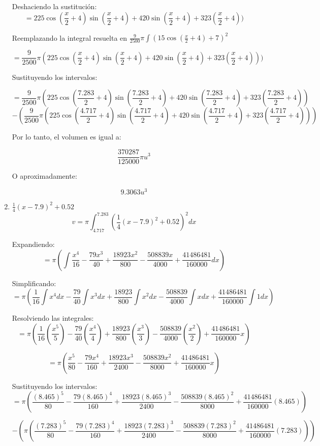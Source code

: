 \documentclass{article}
\begin{document}
\begin{enumerate}
    Deshaciendo la sustitución:
    $$ = 225\cos(\frac{x}{2} + 4) \sin(\frac{x}{2} + 4)+ 420\sin(\frac{x}{2} + 4) + 323 (\frac{x}{2} + 4) )$$
    
    Reemplazando la integral resuelta en $\frac{9}{2500} \pi \int (15 \cos(\frac{x}{2} + 4) + 7)^2$
    
    $$ = \frac{9}{2500} \pi (225\cos(\frac{x}{2} + 4) \sin(\frac{x}{2} + 4)+ 420\sin(\frac{x}{2} + 4) + 323 (\frac{x}{2} + 4) ))$$
    
    Sustituyendo los intervalos:
    
    $$ = \frac{9}{2500} \pi (225\cos(\frac{7.283}{2} + 4) \sin(\frac{7.283}{2} + 4)+ 420\sin(\frac{7.283}{2} + 4) + 323 (\frac{7.283}{2} + 4))$$
    $$ - (\frac{9}{2500} \pi (225\cos(\frac{4.717}{2} + 4) \sin(\frac{4.717}{2} + 4)+ 420\sin(\frac{4.717}{2} + 4) + 323 (\frac{4.717}{2} + 4)))$$
    
    Por lo tanto, el volumen es igual a:
    
    $$\frac{370287}{125000} \pi u^3$$
    
    O aproximadamente:
    
    $$9.3063 u^3$$
    
    \pagebreak
    
    
    \item $\frac{1}{4} (x-7.9)^2+0.52$
    $$ v = \pi \int_{4.717}^{7.283} (\frac{1}{4} (x-7.9)^2+0.52)^2 dx$$
    
    Expandiendo:
    $$ = \pi(\int \dfrac{x^4}{16}-\dfrac{79x^3}{40}+\dfrac{18923x^2}{800}-\dfrac{508839x}{4000}+\dfrac{41486481}{160000} dx) $$
    
    Simplificando:
    $$ = {\pi}( \dfrac{{1}}{16}\int x^4 dx -\dfrac{79}{40} \int x^3 dx + \dfrac{18923}{800} \int x^2 dx - \dfrac{508839}{4000} \int x dx  + \dfrac{41486481}{160000} \int 1 dx )  $$
    
    Resolviendo las integrales:
    $$ = {\pi}( \dfrac{{1}}{16}(\frac{x^5}{5}) -\dfrac{79}{40} (\frac{x^4}{4}) + \dfrac{18923}{800} (\frac{x^3}{3}) - \dfrac{508839}{4000} (\frac{x^2}{2})  + \dfrac{41486481}{160000} x )  $$
    
    $$ = \pi(\dfrac{x^5}{80}-\dfrac{79x^4}{160}+\dfrac{18923x^3}{2400}-\dfrac{508839x^2}{8000}+\dfrac{41486481}{160000}x)$$
    
    Sustituyendo los intervalos:
    $$ = \pi(\dfrac{(8.465)^5}{80}-\dfrac{79(8.465)^4}{160}+\dfrac{18923(8.465)^3}{2400}-\dfrac{508839(8.465)^2}{8000}+\dfrac{41486481}{160000}(8.465)) $$
    
    $$ -(\pi(\dfrac{(7.283)^5}{80}-\dfrac{79(7.283)^4}{160}+\dfrac{18923(7.283)^3}{2400}-\dfrac{508839(7.283)^2}{8000}+\dfrac{41486481}{160000}(7.283))) $$
    

\end{enumerate}
\end{document}

